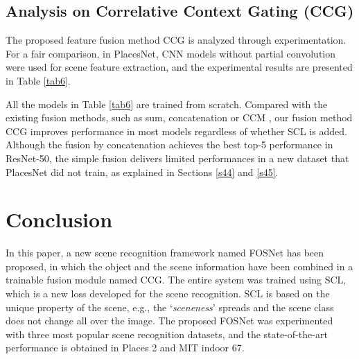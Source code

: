 \documentclass[journal,comsoc]{IEEEtran}
\begin{document}
\subsection{Analysis on Correlative Context Gating (CCG)}
\label{s52}
The proposed feature fusion method CCG is analyzed through experimentation. For a fair comparison, in PlacesNet, CNN models without partial convolution were used for scene feature extraction, and the experimental results are presented in Table \ref{tab6}.

All the models in Table \ref{tab6} are trained from scratch. Compared with the existing fusion methods, such as sum, concatenation or CCM \cite{b21}, our fusion method CCG improves performance in most models regardless of whether SCL is added. Although the fusion by concatenation achieves the best top-5 performance in ResNet-50, the simple fusion delivers limited performances in a new dataset that PlacesNet did not train, as explained in Sections \ref{s44} and \ref{s45}.



\section{Conclusion}
\label{s6}
In this paper, a new scene recognition framework named FOSNet has been proposed, in which the object and the scene information have been combined in a trainable fusion module named CCG. The entire system was trained using SCL, which is a new loss developed for the scene recognition. SCL is based on the unique property of the scene, e.g., the `\textit{sceneness}' spreads and the scene class does not change all over the image. The proposed FOSNet was experimented with three most popular scene recognition datasets, and the state-of-the-art performance is obtained in Places 2 and MIT indoor 67.






















\ifCLASSOPTIONcaptionsoff
  \newpage
\fi
\end{document}
